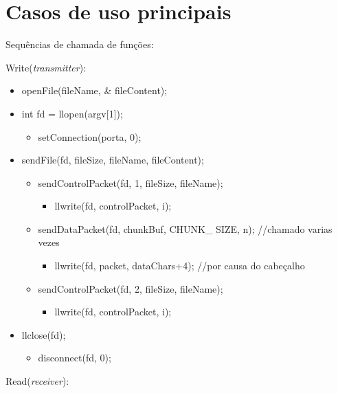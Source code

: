 \documentclass[a4paper,11pt]{article}
\begin{document}
\section{Casos de uso principais}
Sequências de chamada de funções:

Write(\textit{transmitter}):
\renewcommand{\labelitemi}{$-$}
\begin{itemize}
\item openFile(fileName, \& fileContent);
\item int fd = llopen(argv[1]);
\begin{itemize}
\item setConnection(porta, 0);
\end{itemize}
\item sendFile(fd, fileSize, fileName, fileContent);
\begin{itemize}
\item sendControlPacket(fd, 1, fileSize, fileName);
\begin{itemize}
\item llwrite(fd, controlPacket, i);
\end{itemize}
\end{itemize}
\begin{itemize}
\item sendDataPacket(fd, chunkBuf, CHUNK\_ SIZE, n); //chamado varias vezes
\begin{itemize}
\item llwrite(fd, packet, dataChars+4); //por causa do cabeçalho
\end{itemize}
\end{itemize}
\begin{itemize}
\item sendControlPacket(fd, 2, fileSize, fileName);
\begin{itemize}
\item llwrite(fd, controlPacket, i);
\end{itemize}
\end{itemize}
\item llclose(fd);
\begin{itemize}
\item disconnect(fd, 0);
\end{itemize}

\end{itemize}


Read(\textit{receiver}):
\end{document}

